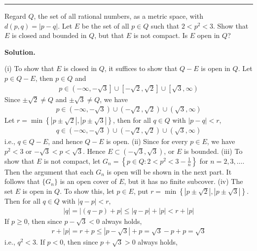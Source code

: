 \documentclass[12pt]{article}
\theoremstyle{definition}
\begin{document}
\bigskip\noindent\hrule\bigskip

Regard $Q$, the set of all rational numbers, as a metric space, with $d(p,q)=\left\vert p-q\right\vert$. Let $E$ be the set of all $p\in Q$ such that $2<p^2<3$. Show that $E$ is closed and bounded in $Q$, but that $E$ is not compact. Is $E$ open in $Q$?

\smallskip
\noindent\textbf{Solution.}\quad

(i) To show that $E$ is closed in $Q$, it suffices to show that $Q-E$ is open in $Q$. Let $p\in Q-E$, then $p\in Q$ and
\begin{align*}
p\in\left(-\infty,-\sqrt{3}\right]\cup\left[-\sqrt{2},\sqrt{2}\right]\cup\left[\sqrt{3},\infty\right)
\end{align*}
Since $\pm\sqrt{2}\ne Q$ and $\pm\sqrt{3}\ne Q$, we have
\begin{align*}
p\in\left(-\infty,-\sqrt{3}\right)\cup\left(-\sqrt{2},\sqrt{2}\right)\cup\left(\sqrt{3},\infty\right)
\end{align*}
Let $r=\min\left\{\left\vert p\pm\sqrt{2}\right\vert,\left\vert p\pm\sqrt{3}\right\vert\right\}$, then for all $q\in Q$ with $\left\vert p-q\right\vert<r$,
\begin{align*}
q\in\left(-\infty,-\sqrt{3}\right)\cup\left(-\sqrt{2},\sqrt{2}\right)\cup\left(\sqrt{3},\infty\right)
\end{align*}
i.e., $q\in Q-E$, and hence $Q-E$ is open.
(ii) Since for every $p\in E$, we have $p^2<3$ or $-\sqrt{3}<p<\sqrt{3}$. Hence $E\subset\left(-\sqrt{3},\sqrt{3}\right)$, or $E$ is bounded.
(iii) To show that $E$ is not compact, let $G_n=\left\{p\in Q:2<p^2<3-\tfrac{1}{n}\right\}$ for $n=2,3,\ldots$. Then the argument that each $G_n$ is open will be shown in the next part. It follows that $\{G_n\}$ is an open cover of $E$, but it has no finite subcover.
(iv) The set $E$ is open in $Q$. To show this, let $p\in E$, put $r=\min\left\{\left\vert p\pm\sqrt{2}\right\vert,\left\vert p\pm\sqrt{3}\right\vert\right\}$. Then for all $q\in Q$ with $\left\vert q-p\right\vert<r$,
\begin{align*}
\left\vert q\right\vert
=\left\vert (q-p)+p\right\vert
\le\left\vert q-p\right\vert+\left\vert p\right\vert
<r+\left\vert p\right\vert
\end{align*}
If $p\ge 0$, then since $p-\sqrt{3}<0$ always holds,
\begin{align*}
r+\left\vert p\right\vert
=r+p
\le\left\vert p-\sqrt{3}\right\vert+p
=\sqrt{3}-p+p
=\sqrt{3}
\end{align*}
i.e., $q^2<3$. If $p<0$, then since $p+\sqrt{3}>0$ always holds,
\end{document}
